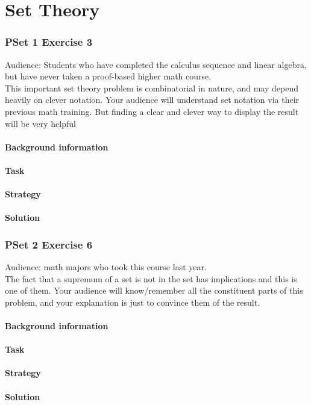 \documentclass[11 pt]{article}
\begin{document}
\part{Set Theory}
\section{PSet 1 Exercise 3}
Audience: Students who have completed the calculus sequence and linear algebra, but have never taken a proof-based higher math course.\\
This important set theory problem is combinatorial in nature, and may depend heavily on
clever notation. Your audience will understand set notation via their previous math training. But finding
a clear and clever way to display the result will be very helpful
\begin{multicols*}{2} 
\subsection{Background information}
\subsection{Task}
\subsection{Strategy}
\columnbreak
\subsection{Solution}
\end{multicols*}
\pagebreak
\section{PSet 2 Exercise 6}
Audience: math majors who took this course last year.\\
The fact that a supremum of a set is not in the set has implications and this is one of
them. Your audience will know/remember all the constituent parts of this problem, and your
explanation is just to convince them of the result.
\begin{multicols*}{2} 
\subsection{Background information}
\subsection{Task}
\subsection{Strategy}
\columnbreak
\subsection{Solution}
\end{multicols*}
\pagebreak
\end{document}
